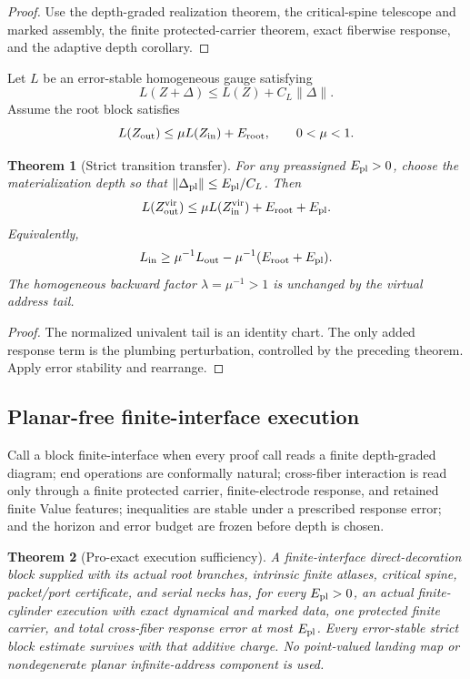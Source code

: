\documentclass[11pt]{article}
\newtheorem{theorem}{Theorem}[section]
\theoremstyle{definition}
\theoremstyle{remark}
\begin{document}
\begin{proof}
Use the depth-graded realization theorem, the critical-spine telescope and
marked assembly, the finite protected-carrier theorem, exact fiberwise response,
and the adaptive depth corollary.
\end{proof}

Let $L$ be an error-stable homogeneous gauge satisfying
\[
 L(Z+\Delta)\le L(Z)+C_L\|\Delta\|.
\]
Assume the root block satisfies
\[
 L(Z_{\rm out})\le\mu L(Z_{\rm in})+E_{\rm root},
 \qquad 0<\mu<1.
\]

\begin{theorem}[Strict transition transfer]
For any preassigned $E_{\rm pl}>0$, choose the materialization depth so that
$\|\Delta_{\rm pl}\|\le E_{\rm pl}/C_L$.  Then
\[
 L(Z^{\rm vir}_{\rm out})
 \le\mu L(Z^{\rm vir}_{\rm in})+E_{\rm root}+E_{\rm pl}.
\]
Equivalently,
\[
 L_{\rm in}\ge\mu^{-1}L_{\rm out}
 -\mu^{-1}(E_{\rm root}+E_{\rm pl}).
\]
The homogeneous backward factor $\lambda=\mu^{-1}>1$ is unchanged by the
virtual address tail.
\end{theorem}

\begin{proof}
The normalized univalent tail is an identity chart.  The only added response
term is the plumbing perturbation, controlled by the preceding theorem.  Apply
error stability and rearrange.
\end{proof}

\subsection{Planar-free finite-interface execution}
Call a block finite-interface when every proof call reads a finite depth-graded
diagram; end operations are conformally natural; cross-fiber interaction is
read only through a finite protected carrier, finite-electrode response, and
retained finite Value features; inequalities are stable under a prescribed
response error; and the horizon and error budget are frozen before depth is
chosen.

\begin{theorem}[Pro-exact execution sufficiency]
A finite-interface direct-decoration block supplied with its actual root
branches, intrinsic finite atlases, critical spine, packet/port certificate,
and serial necks has, for every $E_{\rm pl}>0$, an actual finite-cylinder
execution with exact dynamical and marked data, one protected finite carrier,
and total cross-fiber response error at most $E_{\rm pl}$.  Every
error-stable strict block estimate survives with that additive charge.  No
point-valued landing map or nondegenerate planar infinite-address component is
used.
\end{theorem}
\end{document}
